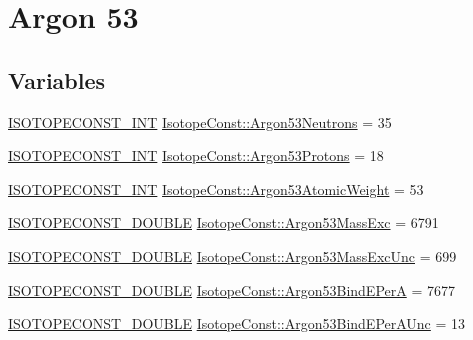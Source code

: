 \hypertarget{group___isotope_const-_argon-_ar53}{}\section{Argon 53}
\label{group___isotope_const-_argon-_ar53}
\subsection*{Variables}
\begin{DoxyCompactItemize}
\item 
\mbox{\hyperlink{group___isotope_const-_macros_ga5f18360b3e99483a35c32d789e62621c}{I\+S\+O\+T\+O\+P\+E\+C\+O\+N\+S\+T\+\_\+\+I\+NT}} \mbox{\hyperlink{group___isotope_const-_argon-_ar53_gaa623166f80cd8488970163d0093ebc02}{Isotope\+Const\+::\+Argon53\+Neutrons}} = 35
\item 
\mbox{\hyperlink{group___isotope_const-_macros_ga5f18360b3e99483a35c32d789e62621c}{I\+S\+O\+T\+O\+P\+E\+C\+O\+N\+S\+T\+\_\+\+I\+NT}} \mbox{\hyperlink{group___isotope_const-_argon-_ar53_ga0c80725661e7b7300859f6b27b1fd4a2}{Isotope\+Const\+::\+Argon53\+Protons}} = 18
\item 
\mbox{\hyperlink{group___isotope_const-_macros_ga5f18360b3e99483a35c32d789e62621c}{I\+S\+O\+T\+O\+P\+E\+C\+O\+N\+S\+T\+\_\+\+I\+NT}} \mbox{\hyperlink{group___isotope_const-_argon-_ar53_gaa3371fa5208de886f7baab8f9412d42f}{Isotope\+Const\+::\+Argon53\+Atomic\+Weight}} = 53
\item 
\mbox{\hyperlink{group___isotope_const-_macros_ga8f45a7272ce02c0b4c65c44636ed719a}{I\+S\+O\+T\+O\+P\+E\+C\+O\+N\+S\+T\+\_\+\+D\+O\+U\+B\+LE}} \mbox{\hyperlink{group___isotope_const-_argon-_ar53_ga804895aba5e13ed4c72f7ad3f48777c6}{Isotope\+Const\+::\+Argon53\+Mass\+Exc}} = 6791
\item 
\mbox{\hyperlink{group___isotope_const-_macros_ga8f45a7272ce02c0b4c65c44636ed719a}{I\+S\+O\+T\+O\+P\+E\+C\+O\+N\+S\+T\+\_\+\+D\+O\+U\+B\+LE}} \mbox{\hyperlink{group___isotope_const-_argon-_ar53_gadddbf8e1ace531c02cd779df04abf326}{Isotope\+Const\+::\+Argon53\+Mass\+Exc\+Unc}} = 699
\item 
\mbox{\hyperlink{group___isotope_const-_macros_ga8f45a7272ce02c0b4c65c44636ed719a}{I\+S\+O\+T\+O\+P\+E\+C\+O\+N\+S\+T\+\_\+\+D\+O\+U\+B\+LE}} \mbox{\hyperlink{group___isotope_const-_argon-_ar53_ga3009ef067467267aaff9003e371931fc}{Isotope\+Const\+::\+Argon53\+Bind\+E\+PerA}} = 7677
\item 
\mbox{\hyperlink{group___isotope_const-_macros_ga8f45a7272ce02c0b4c65c44636ed719a}{I\+S\+O\+T\+O\+P\+E\+C\+O\+N\+S\+T\+\_\+\+D\+O\+U\+B\+LE}} \mbox{\hyperlink{group___isotope_const-_argon-_ar53_gac60ca5a0ae29824d85a9580d180d537c}{Isotope\+Const\+::\+Argon53\+Bind\+E\+Per\+A\+Unc}} = 13

\end{DoxyCompactItemize}
